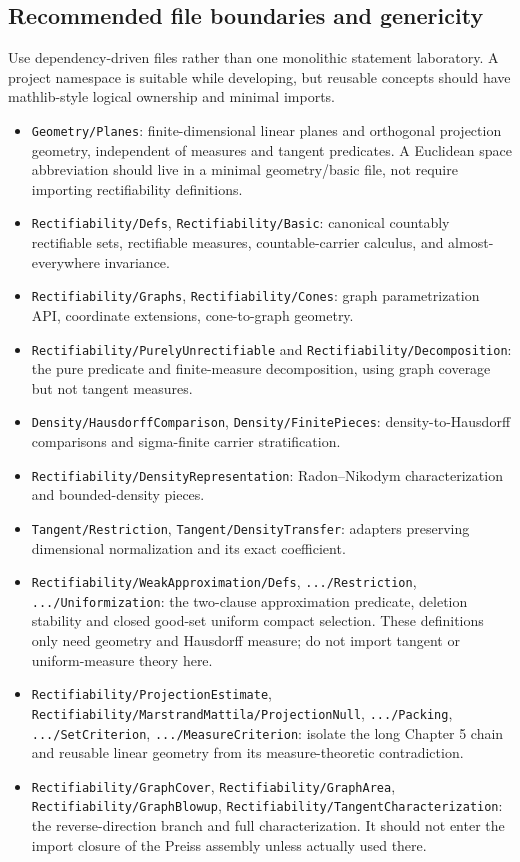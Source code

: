 \subsection{Recommended file boundaries and genericity}

Use dependency-driven files rather than one monolithic statement laboratory.
A project namespace is suitable while developing, but reusable concepts
should have mathlib-style logical ownership and minimal imports.
\begin{itemize}
\item \texttt{Geometry/Planes}: finite-dimensional linear planes and
orthogonal projection geometry, independent of measures and tangent predicates.
A Euclidean space abbreviation should live in a minimal geometry/basic file,
not require importing rectifiability definitions.
\item \texttt{Rectifiability/Defs}, \texttt{Rectifiability/Basic}:
canonical countably rectifiable sets, rectifiable measures, countable-carrier
calculus, and almost-everywhere invariance.
\item \texttt{Rectifiability/Graphs}, \texttt{Rectifiability/Cones}:
graph parametrization API, coordinate extensions, cone-to-graph geometry.
\item \texttt{Rectifiability/PurelyUnrectifiable} and
\texttt{Rectifiability/Decomposition}: the pure predicate and finite-measure
decomposition, using graph coverage but not tangent measures.
\item \texttt{Density/HausdorffComparison}, \texttt{Density/FinitePieces}:
density-to-Hausdorff comparisons and sigma-finite carrier stratification.
\item \texttt{Rectifiability/DensityRepresentation}:
Radon--Nikodym characterization and bounded-density pieces.
\item \texttt{Tangent/Restriction}, \texttt{Tangent/DensityTransfer}:
adapters preserving dimensional normalization and its exact coefficient.
\item \texttt{Rectifiability/WeakApproximation/Defs},
\texttt{.../Restriction}, \texttt{.../Uniformization}:
the two-clause approximation predicate, deletion stability and closed good-set
uniform compact selection. These definitions only need geometry and
Hausdorff measure; do not import tangent or uniform-measure theory here.
\item \texttt{Rectifiability/ProjectionEstimate},
\texttt{Rectifiability/MarstrandMattila/ProjectionNull},
\texttt{.../Packing}, \texttt{.../SetCriterion}, \texttt{.../MeasureCriterion}:
isolate the long Chapter 5 chain and reusable linear geometry from its
measure-theoretic contradiction.
\item \texttt{Rectifiability/GraphCover}, \texttt{Rectifiability/GraphArea},
\texttt{Rectifiability/GraphBlowup}, \texttt{Rectifiability/TangentCharacterization}:
the reverse-direction branch and full characterization. It should not enter
the import closure of the Preiss assembly unless actually used there.
\end{itemize}

